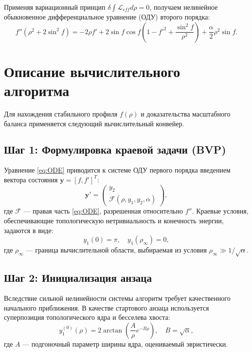 \documentclass[12pt,a4paper]{article}
\begin{document}
Применяя вариационный принцип $\delta \int \mathcal{L}_{eff} d\rho = 0$, получаем нелинейное обыкновенное дифференциальное уравнение (ОДУ) второго порядка:
\begin{equation}
f'' (\rho^2 + 2\sin^2 f) = -2\rho f' + 2\sin f \cos f \left(1 - f'^2 + \frac{\sin^2 f}{\rho^2}\right) + \frac{\alpha}{2} \rho^2 \sin f.
\label{eq:ODE}
\end{equation}

\section{Описание вычислительного алгоритма}
Для нахождения стабильного профиля $f(\rho)$ и доказательства масштабного баланса применяется следующий вычислительный конвейер.

\subsection{Шаг 1: Формулировка краевой задачи (BVP)}
Уравнение \eqref{eq:ODE} приводится к системе ОДУ первого порядка введением вектора состояния $\mathbf{y} = [f, f']^T$:
\begin{equation}
\mathbf{y}' = 
\begin{pmatrix}
y_2 \\
\mathcal{F}(\rho, y_1, y_2, \alpha)
\end{pmatrix},
\end{equation}
где $\mathcal{F}$ — правая часть \eqref{eq:ODE}, разрешенная относительно $f''$. Краевые условия, обеспечивающие топологическую нетривиальность и конечность энергии, задаются в виде:
\begin{equation}
y_1(0) = \pi, \quad y_1(\rho_{\infty}) = 0,
\end{equation}
где $\rho_{\infty}$ — граница вычислительной области, выбираемая из условия $\rho_{\infty} \gg 1/\sqrt{\alpha}$.

\subsection{Шаг 2: Инициализация анзаца}
Вследствие сильной нелинейности системы алгоритм требует качественного начального приближения. В качестве стартового анзаца используется суперпозиция топологического ядра и бесселева хвоста:
\begin{equation}
y_1^{(0)}(\rho) = 2 \arctan\left( \frac{A}{\rho} e^{-B \rho} \right), \quad B = \sqrt{\alpha},
\end{equation}
где $A$ — подгоночный параметр ширины ядра, оцениваемый эвристически.
\end{document}
